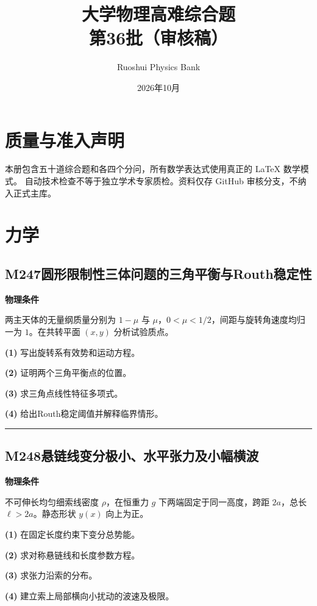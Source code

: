 \documentclass[UTF8,a4paper,11pt,oneside,openany]{ctexbook}
\begin{document}
\title{\textcolor{accent}{大学物理高难综合题}\\\Large 第36批（审核稿）}
\author{Ruoshui Physics Bank}
\date{2026年10月}
\maketitle
\tableofcontents
\chapter*{质量与准入声明}
本册包含五十道综合题和各四个分问，所有数学表达式使用真正的 \LaTeX{} 数学模式。
自动技术检查不等于独立学术专家质检。资料仅存 GitHub 审核分支，不纳入正式主库。

\chapter{力学}
\section*{M247\quad 圆形限制性三体问题的三角平衡与Routh稳定性}
\textbf{物理条件}\par 两主天体的无量纲质量分别为 \(1-\mu\) 与 \(\mu\)，\(0<\mu<1/2\)，间距与旋转角速度均归一为 \(1\)。在共转平面 \((x,y)\) 分析试验质点。
\par\noindent\textbf{(1)} 写出旋转系有效势和运动方程。
\par\noindent\textbf{(2)} 证明两个三角平衡点的位置。
\par\noindent\textbf{(3)} 求三角点线性特征多项式。
\par\noindent\textbf{(4)} 给出Routh稳定阈值并解释临界情形。

\par\bigskip\hrule\bigskip
\section*{M248\quad 悬链线变分极小、水平张力及小幅横波}
\textbf{物理条件}\par 不可伸长均匀细索线密度 \(\rho\)，在恒重力 \(g\) 下两端固定于同一高度，跨距 \(2a\)，总长 \(\ell>2a\)。静态形状 \(y(x)\) 向上为正。
\par\noindent\textbf{(1)} 在固定长度约束下变分总势能。
\par\noindent\textbf{(2)} 求对称悬链线和长度参数方程。
\par\noindent\textbf{(3)} 求张力沿索的分布。
\par\noindent\textbf{(4)} 建立索上局部横向小扰动的波速及极限。
\end{document}
